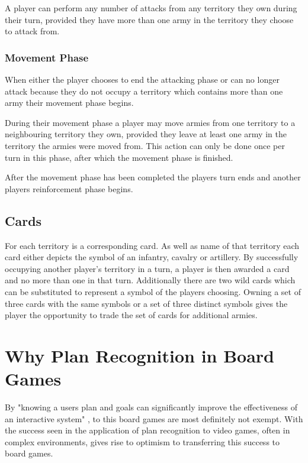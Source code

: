 \documentclass[parskip]{cs4rep}
\begin{document}
A player can perform any number of attacks from any territory they own during their turn, provided they have more than one army in the territory they choose to attack from.

\subsubsection{Movement Phase}

When either the player chooses to end the attacking phase or can no longer attack because they do not occupy a territory which contains more than one army their movement phase begins.

During their movement phase a player may move armies from one territory to a neighbouring territory they own, provided they leave at least one army in the territory the armies were moved from. This action can only be done once per turn in this phase, after which the movement phase is finished.

After the movement phase has been completed the players turn ends and another players reinforcement phase begins.
\newpage

\subsection{Cards}

For each territory is a corresponding card. As well as name of that territory each card either depicts the symbol of an infantry, cavalry or artillery. By successfully occupying another player's territory in a turn, a player is then awarded a card and no more than one in that turn. Additionally there are two wild cards which can be substituted to represent a symbol of the players choosing. Owning a set of three cards with the same symbols or a set of three distinct symbols gives the player the opportunity to trade the set of cards for additional armies.

\section{Why Plan Recognition in Board Games}

By "knowing a users plan and goals can significantly improve the effectiveness of an interactive system" \cite{Carberry:2001:TPR:598284.598348}, to this board games are most definitely not exempt. With the success seen in the application of plan recognition to video games, often in complex environments, gives rise to optimism to transferring this success to board games.
\end{document}
